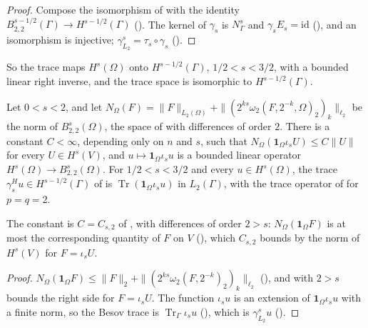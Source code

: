 \begin{proof}
\leanok
Compose the isomorphism of  with the identity
$B^{s-1/2}_{2,2}(\Gamma) \to H^{s-1/2}(\Gamma)$ (). The kernel
of $\gamma_s$ is $N^s_\Gamma$ and $\gamma_s E_s = \mathrm{id}$ (),
and an isomorphism is injective; $\gamma^s_{L_2} = \tau_s \circ \gamma_s$ ().
\end{proof}

So the trace maps $H^s(\Omega)$ onto $H^{s-1/2}(\Gamma)$, $1/2 < s < 3/2$, with a bounded linear
right inverse, and the trace space is isomorphic to $H^{s-1/2}(\Gamma)$.

\begin{theorem}
\label{thm:sobolev-trace-besov}
\leanok
{}
Let $0 < s < 2$, and let
$N_\Omega(F) = \|F\|_{L_2(\Omega)} + \|(2^{ks} \omega_2(F, 2^{-k}, \Omega)_2)_k\|_{\ell_2}$ be the
norm of $B^s_{2,2}(\Omega)$, the space of  with differences of order
$2$. There is a constant $C < \infty$, depending only on $n$ and $s$, such that
$N_\Omega(\mathbf 1_\Omega \iota_s U) \leq C \|U\|$ for every $U \in H^s(V)$, and
$u \mapsto \mathbf 1_\Omega \iota_s u$ is a bounded linear operator
$H^s(\Omega) \to B^s_{2,2}(\Omega)$. For $1/2 < s < 3/2$ and every $u \in H^s(\Omega)$, the trace
$\gamma^H_s u \in H^{s-1/2}(\Gamma)$ of  is
$\operatorname{Tr}(\mathbf 1_\Omega \iota_s u)$ in $L_2(\Gamma)$, with the trace operator of
 for $p = q = 2$.
\end{theorem}

The constant is $C = C_{s,2}$ of , with differences of order
$2 > s$: $N_\Omega(\mathbf 1_\Omega F)$ is at most the corresponding quantity of $F$ on $V$
(), which $C_{s,2}$ bounds by the norm of $H^s(V)$ for
$F = \iota_s U$.

\begin{proof}
\leanok
$N_\Omega(\mathbf 1_\Omega F) \leq \|F\|_2 + \|(2^{ks} \omega_2(F, 2^{-k})_2)_k\|_{\ell_2}$
(), and  with $2 > s$ bounds the
right side for $F = \iota_s U$. The function $\iota_s u$ is an extension of
$\mathbf 1_\Omega \iota_s u$ with a finite norm, so the Besov trace is
$\operatorname{Tr}_\Gamma \iota_s u$ (), which is
$\gamma^s_{L_2} u$ ().
\end{proof}

